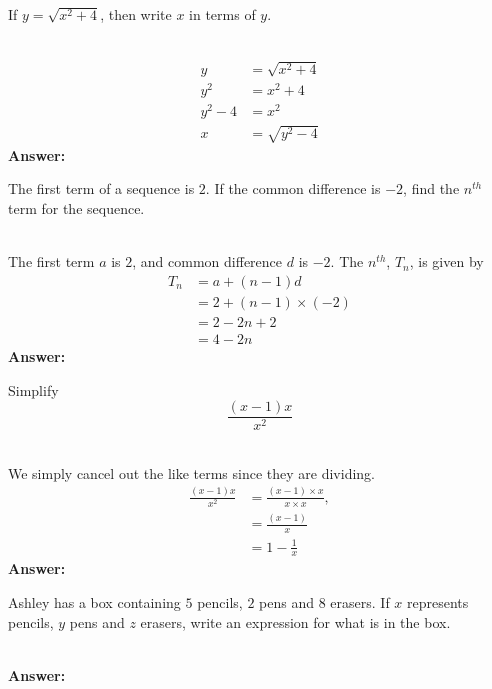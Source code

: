 \documentclass[addpoints,12pt]{exam}
\begin{document}
\begin{questions}
 \question If $y=\sqrt{x^2 + 4}$, then write $x$ in terms of $y$.
	\ifprintanswers
	  \begin{solution}\\
		\begin{align*}
		  y &= \sqrt{x^2 + 4} \\
		  y^2 &= x^2 +4 \\
		  y^2 - 4 &= x^2 \\
		  x &= \sqrt{y^2 - 4}
		\end{align*}
		\textbf{Answer: }
	  \end{solution}
	\else
	  \makeemptybox{1.33in}
	\fi
	
 \question The first term of a sequence is $2$. If the common difference is $-2$, find the 
$n^{th}$ term for the sequence.
	\ifprintanswers
	  \begin{solution}\\
		The first term $a$ is $2$, and common difference $d$ is $-2$. The $n^{th}$, $T_n$, is given 
by
		\begin{align*}
		  T_n &= a + (n-1)d \\
		  &= 2 + (n-1)\times(-2) \\
		  &= 2 -2n +2 \\
		  &= 4 - 2n
		\end{align*}
		\textbf{Answer: }
	  \end{solution}
	\else
	  \makeemptybox{1.33in}
	\fi
	
 \question Simplify $$\frac{(x-1)x}{x^2}$$
	\ifprintanswers
	  \begin{solution}\\
		We simply cancel out the like terms since they are dividing.
		\begin{align*}		  
		  \frac{(x-1)x}{x^2} &= \frac{(x-1)\times x}{x\times x}, \\
		  &= \frac{(x-1)}{x} \\
		  &= 1 - \frac{1}{x}
		\end{align*}
		\textbf{Answer: }
	  \end{solution}
	\else
	  \makeemptybox{1.33in}
	\fi
	
 \question Ashley has a box containing $5$ pencils, $2$ pens and $8$ erasers. If $x$ represents 
pencils, $y$ pens and $z$ erasers, write an expression for what is in the box.
	\ifprintanswers
	  \begin{solution}\\
		\textbf{Answer: }
	  \end{solution}
	\else
	  \makeemptybox{1.33in}
	\fi
	

\end{questions}
\end{document}
